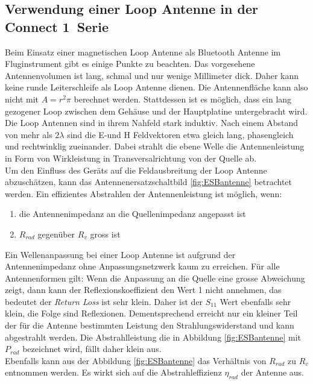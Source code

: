 \subsection{Verwendung einer Loop Antenne in der \glqq Connect 1\grqq \ Serie}
Beim Einsatz einer magnetischen Loop Antenne als Bluetooth Antenne im Fluginstrument gibt es einige Punkte zu beachten. Das vorgesehene Antennenvolumen ist lang, schmal und nur wenige Millimeter dick. Daher kann keine runde Leiterschleife als Loop Antenne dienen. Die Antennenfläche kann also nicht mit $A=r^{2}\pi$ berechnet werden. Stattdessen ist es möglich, dass ein lang gezogener Loop zwischen dem Gehäuse und der Hauptplatine untergebracht wird. Die Loop Antennen sind in ihrem Nahfeld stark induktiv. Nach einem Abstand von mehr als $2\lambda$ sind die E-und H Feldvektoren etwa gleich lang, phasengleich und rechtwinklig zueinander. Dabei strahlt die ebene Welle die Antennenleistung in Form von Wirkleistung in Transversalrichtung von der Quelle ab.\\
Um den Einfluss des Geräts auf die Feldausbreitung der Loop Antenne abzuschätzen, kann das Antennenersatzschaltbild \ref{fig:ESBantenne} betrachtet werden. Ein effizientes Abstrahlen der Antennenleistung ist möglich, wenn:
 \begin{enumerate}[label={\alph*)}] 
 \item die Antennenimpedanz an die Quellenimpedanz angepasst ist 
 \item $R_{rad}$ gegenüber $R_{v}$ gross ist 
 \end{enumerate} 
Ein Wellenanpassung bei einer Loop Antenne ist aufgrund der Antennenimpedanz ohne Anpassungsnetzwerk kaum zu erreichen. Für alle Antennenformen gilt: Wenn die Anpassung an die Quelle eine grosse Abweichung zeigt, dann kann der Reflexionskoeffizient den Wert 1 nicht annehmen, das bedeutet der \textit{Return Loss} ist sehr klein. Daher ist der $S_{11}$ Wert ebenfalls sehr klein, die Folge sind Reflexionen. 
Dementsprechend erreicht nur ein kleiner Teil der für die Antenne bestimmten Leistung den Strahlungswiderstand und kann abgestrahlt werden. Die Abstrahlleistung die in Abbildung \ref{fig:ESBantenne} mit $P_{rad}$ bezeichnet wird, fällt daher klein aus.\\
Ebenfalls kann aus der Abbildung \ref{fig:ESBantenne} das Verhältnis von $R_{rad}$ zu $R_{v}$ entnommen werden. Es wirkt sich auf die Abstrahleffizienz $\eta_{rad}$ der Antenne aus.

